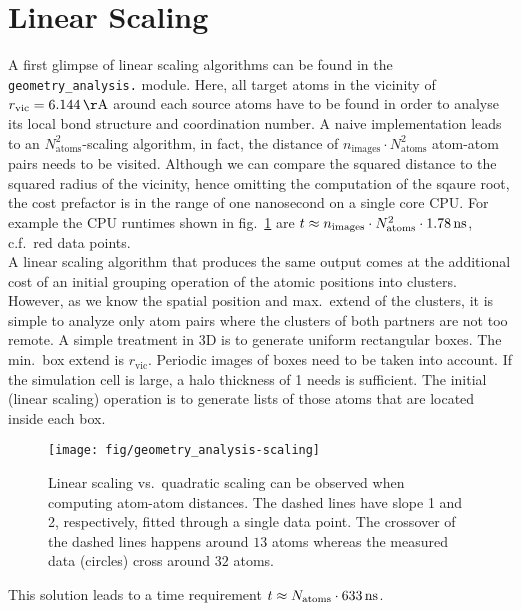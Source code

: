 \documentclass[oribibl]{llncs}
\newcommand{\um}[1]{_{\mathrm{#1}}}
\newcommand{\ttt}[1]{\texttt{#1}}
\begin{document}
\section{Linear Scaling}\label{sec:linear-scaling}
%
A first glimpse of linear scaling algorithms can be found in the
\ttt{geometry\_analysis.} module.
Here, all target atoms in the vicinity of $r\um{vic} = \unit[6.144]{\AA}$ around each source atoms
have to be found in order to analyse its local bond structure
and coordination number.
A naive implementation leads to an $N\um{atoms}^2$-scaling algorithm,
in fact, the distance of $n\um{images} \cdot N\um{atoms}^2$ atom-atom pairs
needs to be visited.
Although we can compare the squared distance to the squared radius of the vicinity,
hence omitting the computation of the sqaure root, the cost prefactor
is in the range of one nanosecond on a single core CPU.
For example the CPU runtimes shown in fig.~\ref{fig:geometry-analysis-scaling}
are $t \approx n\um{images} \cdot N\um{atoms}^2 \cdot \unit[1.78]{ns}$, c.f.~red data points.
\\
A linear scaling algorithm that produces the same output comes at the additional
cost of an initial grouping operation of the atomic positions into clusters.
However, as we know the spatial position and max.~extend of the clusters,
it is simple to analyze only atom pairs where the clusters of both partners
are not too remote.
A simple treatment in 3D is to generate uniform rectangular boxes. 
The min.~box extend is $r\um{vic}$.
Periodic images of boxes need to be taken into account.
If the simulation cell is large, a halo thickness of 1 needs is sufficient.
The initial (linear scaling) operation is to generate lists of those atoms
that are located inside each box.
%
\begin{figure}
  \begin{minipage}[c]{.990\textwidth}
	\texttt{[image: fig/geometry\_analysis-scaling]} %
  \end{minipage}\hfill
  \begin{minipage}[c]{.009\textwidth}
  \end{minipage}
  \label{fig:geometry-analysis-scaling}
  \caption{
  Linear scaling vs.~quadratic scaling can be observed when computing atom-atom distances.
  The dashed lines have slope 1 and 2, respectively, fitted through a single data point.
  The crossover of the dashed lines happens around $13$ atoms 
  whereas the measured data (circles) cross around $32$ atoms.
  }
\end{figure}
%
%
This solution leads to a time requirement $t \approx N\um{atoms} \cdot \unit[633]{ns}$.
\end{document}
